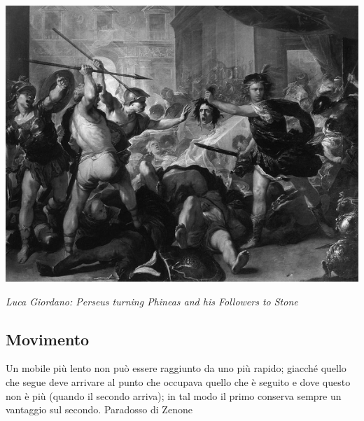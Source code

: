 \begin{center}

\includegraphics[width=0.8\linewidth]{immagini/Perseus_Fighting_Phineus_and_his_Companions.png}

	\emph{Luca Giordano: Perseus turning Phineas and his Followers to Stone}

\end{center}


\pagebreak

\subsection{Movimento}\label{movimento}

\begin{changemargin}{0.3cm}{0.3cm}\begin{enfasi}{Un mobile più lento non può essere raggiunto da uno più rapido; giacché quello che segue deve arrivare al punto che occupava quello che è seguito e dove questo non è più (quando il secondo arriva); in tal modo il primo conserva sempre un vantaggio sul secondo. Paradosso di Zenone}
\end{enfasi}\end{changemargin}\medskip

